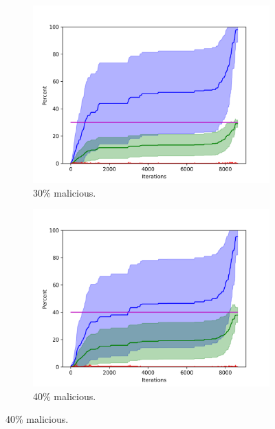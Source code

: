 \begin{figure}
\centering

\begin{subfigure}{0.6\textwidth}
\includegraphics[width=\linewidth]{images/plots/Network_rA/10_30.png}
\caption{30\% malicious.}
\end{subfigure}


\begin{subfigure}{0.6\textwidth}
\includegraphics[width=\linewidth]{images/plots/Network_rA/10_40.png}
\caption{40\% malicious.}
\end{subfigure}


\end{figure}
